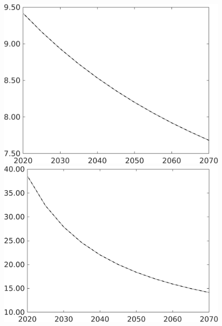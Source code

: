 \documentclass[12pt]{article}
\begin{document}
\begin{figure}[h!!]
\begin{minipage}[]{0.32\textwidth}
	\end{minipage}	
	\begin{minipage}[]{0.32\textwidth}
		\includegraphics[width=1\textwidth]{../../codding_model/own_basedOnFried/optimalPol_010922_revision/figures/all_13Sept22/CompTaul_LFBAU_Reg0_gAn_spillover0_nsk0_xgr0_knspil0_sep1_countec0_GovRev0_etaa0.79_lgd0.png}
	\end{minipage}	
	\begin{minipage}[]{0.32\textwidth}
		\includegraphics[width=1\textwidth]{../../codding_model/own_basedOnFried/optimalPol_010922_revision/figures/all_13Sept22/CompTaul_LFBAU_Reg0_gAg_spillover0_nsk0_xgr0_knspil0_sep1_countec0_GovRev0_etaa0.79_lgd0.png}

\end{minipage}
\end{figure}
\end{document}
